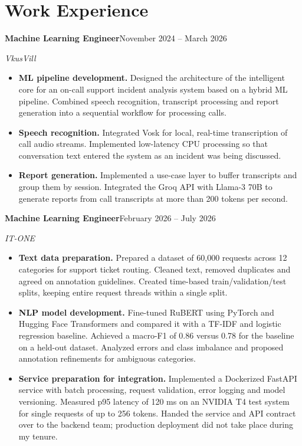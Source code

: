 \documentclass[a4paper,11pt]{article}
\newcommand{\entry}[3]{\textbf{#1}\hfill #3\par\textit{#2}\par}
\begin{document}
\section*{Work Experience}
\fontsize{10.5}{11.9}\selectfont
\entry{Machine Learning Engineer}{VkusVill}{November 2024 -- March 2026}
\begin{itemize}
\item \textbf{ML pipeline development.} Designed the architecture of the intelligent core for an on-call support incident analysis system based on a hybrid ML pipeline. Combined speech recognition, transcript processing and report generation into a sequential workflow for processing calls.
\item \textbf{Speech recognition.} Integrated Vosk for local, real-time transcription of call audio streams. Implemented low-latency CPU processing so that conversation text entered the system as an incident was being discussed.
\item \textbf{Report generation.} Implemented a use-case layer to buffer transcripts and group them by session. Integrated the Groq API with Llama-3 70B to generate reports from call transcripts at more than 200 tokens per second.
\end{itemize}
\vspace{4pt}
\entry{Machine Learning Engineer}{IT-ONE}{February 2026 -- July 2026}
\begin{itemize}
\item \textbf{Text data preparation.} Prepared a dataset of 60,000 requests across 12 categories for support ticket routing. Cleaned text, removed duplicates and agreed on annotation guidelines. Created time-based train/validation/test splits, keeping entire request threads within a single split.
\item \textbf{NLP model development.} Fine-tuned RuBERT using PyTorch and Hugging Face Transformers and compared it with a TF-IDF and logistic regression baseline. Achieved a macro-F1 of 0.86 versus 0.78 for the baseline on a held-out dataset. Analyzed errors and class imbalance and proposed annotation refinements for ambiguous categories.
\item \textbf{Service preparation for integration.} Implemented a Dockerized FastAPI service with batch processing, request validation, error logging and model versioning. Measured p95 latency of 120 ms on an NVIDIA T4 test system for single requests of up to 256 tokens. Handed the service and API contract over to the backend team; production deployment did not take place during my tenure.
\end{itemize}
\end{document}
